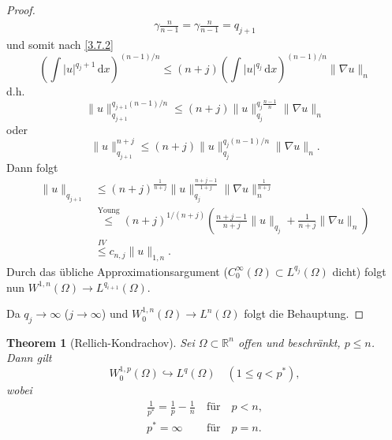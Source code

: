 \documentclass[
paper=a4,
bibtotocnumbered,
liststotocnumbered,
tablecaptionabove,
pointlessnumbers,
twoside,
openright,
10pt
]
{report}
\newtheorem{thm}{Theorem}[chapter]
\theoremstyle{definition}
\numberwithin{equation}{chapter}
\begin{document}
\begin{proof}
\begin{align*}
\gamma \frac{n}{n-1} = \gamma \frac{n}{n-1} = q_{j+1}
\end{align*}
 und somit nach  \eqref{3.7.2}
\begin{equation}
 \left (\int |u|^{q_j+1} \, \mathrm dx\right )^{(n-1)/n} \le (n+j) \left ( \int |u|^{q_j}\, \mathrm dx\right )^{(n-1)/n} \| \nabla u\|_n
\end{equation}
d.h.
\begin{equation}
 \|u\|_{q_{j+1}}^{q_{j+1} (n-1)/n} \le ( n+j) \| u\|_{q_j}^{q_j \frac{n-1}{n}} \| \nabla u\|_n 
\end{equation}
oder
\begin{equation}
 \| u\|^{n+j}_{q_{j+1}} \le (n+j) \| u\|_{q_j}^{q_j (n-1)/n}\| \nabla u\|_n.
\end{equation}
Dann folgt
\begin{align*}
 \|u\|_{q_{j+1}} &\le (n+j)^{\frac{1}{n+j}} \|u\|_{q_j}^{\frac{n+j-1}{1+j}}\| \nabla u\|_n^{\frac{1}{n+j}}\\
 &\overset{\text{Young}}{\le} (n+j)^{1/(n+j)} \left( \frac{n+j-1}{n+j} \| u \|_{q_j} + \frac{1}{n+j} \|\nabla u \|_n \right)\\ 
 &\overset{IV}{\le} c_{n,j} \| u \|_{1,n}.
\end{align*}
Durch das übliche Approximationsargument ($C_0^\infty(\Omega) \subset L^{q_j}(\Omega)$ dicht) folgt nun $W^{1,n}(\Omega) \to L^{q_{i+1}}(\Omega)$.

Da $q_j \to \infty$ ($j\to \infty$) und $W_0^{1,n}(\Omega) \to L^n(\Omega)$ folgt die Behauptung.
\end{proof}
\begin{thm}[Rellich-Kondrachov]\label{3.8}
 Sei $\Omega \subset \mathbb R^n$ offen und beschränkt,  $p\le n$. Dann gilt 
 \begin{equation}
  W_0^{1,p}(\Omega) \hookrightarrow L^q(\Omega) \quad (1\le q < p^*),
 \end{equation}
wobei
 \begin{align*}
  \frac{1}{p^*} = \frac{1}{p} - \frac{1}{n} &\ \text{für} \quad p<n,\\
  p^*=\infty &\ \text{für} \quad p=n.
 \end{align*}
\end{thm}
\end{document}

